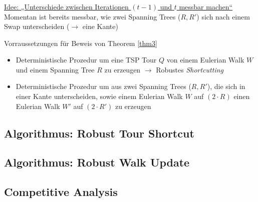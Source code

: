 \begin{frame}
    \frametitle{\insertsubsection}
    \underline{Idee: „Unterschiede zwischen Iterationen $(t-1)$ und $t$ messbar machen“}\\
    \vspace{0.8em}
    Momentan ist bereits messbar, wie zwei Spanning Trees ($R, R'$) sich nach einem Swap unterscheiden ($\rightarrow$ eine Kante)\\
    \vspace{0.8em}
    \begin{block}{Vorraussetzungen für Beweis von Theorem \ref{thm3}}
        \vspace{0.8em}
        \begin{itemize}
            \itemsep\setlength{.8em}
            \item Deterministische Prozedur um eine TSP Tour $Q$ von einem Eulerian Walk $W$ und einem Spanning Tree $R$ zu erzeugen $\rightarrow$ Robustes \emph{Shortcutting}
            \item Deterministische Prozedur um aus zwei Spanning Trees ($R, R'$), die sich in einer Kante unterscheiden, sowie einem Eulerian Walk $W$ auf $(2\cdot R)$ einen Eulerian Walk $W'$ auf $(2\cdot R')$ zu erzeugen 
        \end{itemize}
        \vspace{0.8em}
    \end{block}
\end{frame}

\subsection{Algorithmus: Robust Tour Shortcut}
\begin{frame}
    \frametitle{\insertsubsection}
    
\end{frame}

\subsection{Algorithmus: Robust Walk Update}
\begin{frame}
    \frametitle{\insertsubsection}
    
\end{frame}

\subsection{Competitive Analysis}
\begin{frame}
    \frametitle{\insertsubsection}
    
\end{frame}
